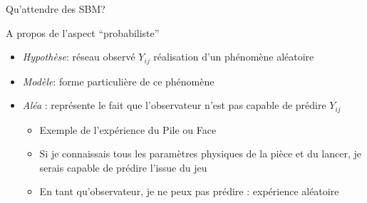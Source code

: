 \documentclass[compress,10pt]{beamer}
\begin{document}
\begin{frame}{Qu'attendre des SBM? }
\begin{overlayarea}{10cm}{20cm}

\end{overlayarea}


\end{frame}




\begin{frame}{A propos de l'aspect ``probabiliste''}

\begin{itemize}
\item \emph{Hypothèse}: réseau observé $Y_{ij}$ réalisation d'un phénomène aléatoire
\item \emph{Modèle}:  forme particulière de ce phénomène
\item \emph{Aléa} :  représente le fait que l'observateur n'est pas capable de prédire $Y_{ij}$

\begin{itemize}
\item Exemple de l'expérience du Pile ou Face
\item  Si je connaissais tous les paramètres physiques de la pièce et du lancer, je serais capable de prédire l'issue du jeu
\item En tant qu'observateur, je ne peux pas prédire : expérience aléatoire
\end{itemize}

\end{itemize}

\end{frame}
\end{document}
